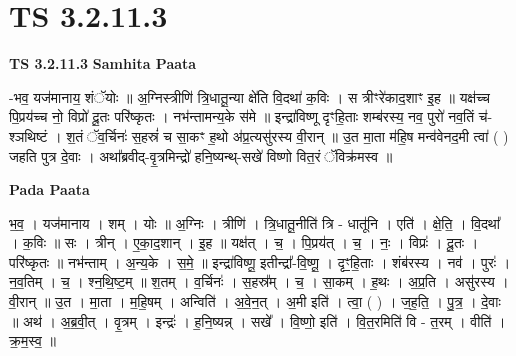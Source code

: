 \documentclass[17pt]{extarticle}
\begin{document}
\section*{ TS 3.2.11.3 }

\textbf{TS 3.2.11.3 } \newline
\textbf{Samhita Paata} \newline

-भव॒ यज॑मानाय॒ शंॅयोः ॥ अ॒ग्निस्त्रीणि॑ त्रि॒धातू॒न्या क्षे॑ति वि॒दथा॑ क॒विः । स त्रीꣳरे॑काद॒शाꣳ इ॒ह ॥ यक्ष॑च्च पि॒प्रय॑च्च नो॒ विप्रो॑ दू॒तः परि॑ष्कृतः । नभ॑न्तामन्य॒के स॑मे ॥ इन्द्रा॑विष्णू दृꣳहि॒ताः शम्ब॑रस्य॒ नव॒ पुरो॑ नव॒तिं च॑- श्ञथिष्टं । श॒तं ॅव॒र्चिनः॑ स॒हस्रं॑ च सा॒कꣳ ह॒थो अ॑प्र॒त्यसु॑रस्य वी॒रान् ॥ उ॒त मा॒ता म॑हि॒ष मन्व॑वेनद॒मी त्वा॑ ( ) जहति पुत्र दे॒वाः । अथा᳚ब्रवीद्-वृ॒त्रमिन्द्रो॑ हनि॒ष्यन्थ्-सखे॑ विष्णो वित॒रं ॅविक्र॑मस्व ॥ \newline

\textbf{Pada Paata} \newline

भ॒व॒ । यज॑मानाय । शम् । योः ॥ अ॒ग्निः । त्रीणि॑ । त्रि॒धातू॒नीति॑ त्रि - धातू॑नि । एति॑ । क्षे॒ति॒ । वि॒दथा᳚ । क॒विः ॥ सः । त्रीन् । ए॒का॒द॒शान् । इ॒ह ॥ यक्ष॑त् । च॒ । पि॒प्रय॑त् । च॒ । नः॒ । विप्रः॑ । दू॒तः । परि॑ष्कृतः ॥ नभ॑न्ताम् । अ॒न्य॒के । स॒मे॒ ॥ इन्द्रा॑विष्णू॒ इतीन्द्रा᳚-वि॒ष्णू॒ । दृꣳ॒॒हि॒ताः । शंब॑रस्य । नव॑ । पुरः॑ । न॒व॒तिम् । च॒ । श्न॒थि॒ष्ट॒म् ॥ श॒तम् । व॒र्चिनः॑ । स॒हस्र᳚म् । च॒ । सा॒कम् । ह॒थः । अ॒प्र॒ति । असु॑रस्य । वी॒रान् ॥ उ॒त । मा॒ता । म॒हि॒षम् । अन्विति॑ । अ॒वे॒न॒त् । अ॒मी इति॑ । त्वा॒ ( ) । ज॒ह॒ति॒ । पु॒त्र॒ । दे॒वाः ॥ अथ॑ । अ॒ब्र॒वी॒त् । वृ॒त्रम् । इन्द्रः॑ । ह॒नि॒ष्यन्न् । सखे᳚ । वि॒ष्णो॒ इति॑ । वि॒त॒रमिति॑ वि - त॒रम् । वीति॑ । क्र॒म॒स्व॒ ॥  \newline
\end{document}
